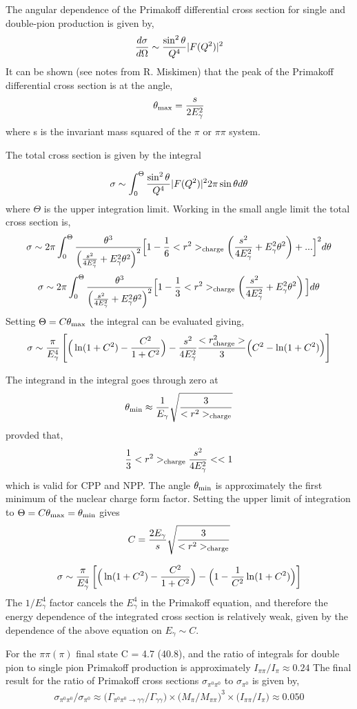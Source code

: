 The angular dependence of the Primakoff differential cross section for single and double-pion production is given by,
$$ {d\sigma \over d \Omega} \sim {\sin^2 \theta \over Q^4}|F(Q^2)|^2$$
It can be shown (see notes from R. Miskimen) that the peak of the Primakoff differential cross section is at the angle,
$$ \theta_{\rm max}={s \over 2 E^2_\gamma}$$
where s is the invariant mass squared of the $\pi$ or $\pi \pi$ system.   

The total cross section is given by the integral

$$ \sigma \sim \int^\Theta_0 {\sin^2 \theta \over Q^4}|F(Q^2)|^2 2 \pi \sin \theta d\theta$$
where $\Theta$ is the upper integration limit. Working in the small angle limit the total cross section is,
$$\sigma \sim 2\pi \int^\Theta_0 
{\theta^3 \over \left( {s^2 \over 4E^2_\gamma}+ E^2_\gamma \theta^2  \right)^2} 
\Big[ 1-{1 \over 6}<r^2>_{\rm charge}\left( {s^2 \over 4E^2_\gamma}+ E^2_\gamma \theta^2  \right) +... \Big]^2
d \theta$$
$$\sigma \sim 2\pi \int^\Theta_0 
{\theta^3 \over \left( {s^2 \over 4E^2_\gamma}+ E^2_\gamma \theta^2  \right)^2} 
\Big[ 1-{1 \over 3}<r^2>_{\rm charge}\left( {s^2 \over 4E^2_\gamma}+ E^2_\gamma \theta^2  \right) \Big]
d \theta$$
Setting $\Theta = C\theta_{\rm max}$ the integral can be evaluated giving, 
$$ \sigma \sim {\pi \over E^4_\gamma}
\left[ \Big( \ln(1+C^2)-{C^2 \over 1+C^2}  \Big)
- {s^2 \over 4 E^2_\gamma}  { <r^2_{\rm charge}> \over 3} 
\Big(C^2 - \ln(1+C^2) \Big) \right]$$

The integrand in the integral goes through zero at
$$\theta_{\rm min} \approx {1 \over E_\gamma}\sqrt{3 \over <r^2>_{\rm charge}}$$
provded that,
$$ {1 \over 3} <r^2>_{\rm charge}{s^2 \over 4 E^2_\gamma} << 1$$
which is valid for CPP and NPP. The angle $\theta_{\rm min}$ is approximately the first minimum of the nuclear charge form factor. 
Setting the upper limit of integration to  $\Theta = C \theta_{\rm max} = \theta_{\rm min}$ gives 
$$C= {2 E_\gamma  \over s}\sqrt{3 \over <r^2>_{\rm charge}}$$

$$ \sigma \sim {\pi \over E^4_\gamma}
\left[ \Big( \ln(1+C^2)-{C^2 \over 1+C^2}  \Big)
- 
\Big(1 - {1 \over C^2} \ln(1+C^2) \Big) \right]$$
The $1/E^4_\gamma$ factor cancels the $E^4_\gamma$ in the Primakoff equation, and therefore the energy dependence of the integrated cross section is relatively weak, given by the dependence of the above equation on  $E_\gamma \sim C$.  

For the $\pi \pi (\pi)$ final state C = 4.7 (40.8), and the ratio of integrals for double pion to single pion Primakoff production is approximately $I_{\pi\pi} / I_{\pi} \approx 0.24$
The final result for the ratio of Primakoff cross sections $\sigma_{\pi^0 \pi^0}$ to $ \sigma_{\pi^0}$ is given by, 
\begin{eqnarray}
\sigma_{\pi^0 \pi^0}   \Big/ \sigma_{ \pi^0}   
\approx 
\Big(\Gamma_{\pi^0 \pi^0 \rightarrow \gamma \gamma}
\Big/ \Gamma_{\gamma \gamma} \Big)
\times \Big( M_\pi \Big/ 
M_{\pi \pi}\Big)^3\times \Big( I_{\pi \pi} \Big/ I_\pi \Big)
\approx 0.050  \label{eq:sigpipi_over_sigpi}
\end{eqnarray}



